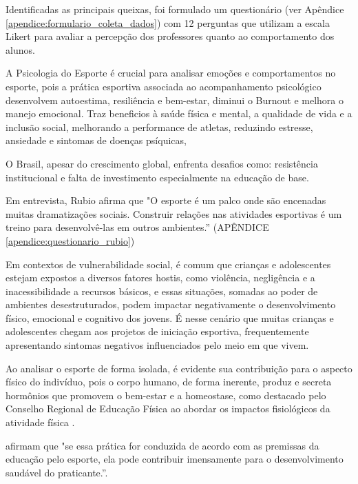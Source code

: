\begin{Desenvolvimento}
Identificadas as principais queixas, foi formulado um questionário (ver Apêndice \ref{apendice:formulario_coleta_dados}) com 12 perguntas que utilizam a escala Likert para avaliar a percepção dos professores quanto ao comportamento dos alunos.



A Psicologia do Esporte é crucial para analisar emoções e comportamentos no esporte, pois a prática esportiva associada ao acompanhamento psicológico desenvolvem autoestima, resiliência e bem-estar, diminui o Burnout e melhora o manejo emocional. Traz beneficios à saúde física e mental, a qualidade de vida e a inclusão social, melhorando a performance de atletas, reduzindo estresse, ansiedade e sintomas de doenças psíquicas,

O Brasil, apesar do crescimento global, enfrenta desafios como: resistência institucional e falta de investimento especialmente na educação de base.

Em entrevista, Rubio afirma que "O esporte é um palco onde são encenadas muitas dramatizações sociais. Construir relações nas atividades esportivas é um treino para desenvolvê-las em outros ambientes.” (APÊNDICE \ref{apendice:questionario_rubio})

Em contextos de vulnerabilidade social, é comum que crianças e adolescentes estejam expostos a diversos fatores hostis, como violência, negligência e a inacessibilidade a recursos básicos, e essas situações, somadas ao poder de ambientes desestruturados, podem impactar negativamente o desenvolvimento físico, emocional e cognitivo dos jovens. É nesse cenário que muitas crianças e adolescentes chegam aos projetos de iniciação esportiva, frequentemente apresentando sintomas negativos influenciados pelo meio em que vivem.

Ao analisar o esporte de forma isolada, é evidente sua contribuição para o aspecto físico do indivíduo, pois o corpo humano, de forma inerente, produz e secreta hormônios que promovem o bem-estar e a homeostase, como destacado pelo Conselho Regional de Educação Física ao abordar os impactos fisiológicos da atividade física .

 afirmam que "se essa prática for conduzida de acordo com as premissas da educação pelo esporte, ela pode contribuir imensamente para o desenvolvimento saudável do praticante.”.


\end{Desenvolvimento}
